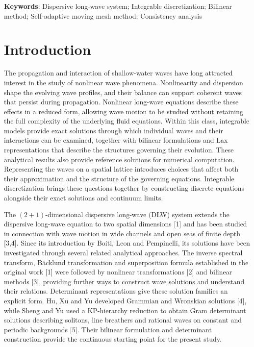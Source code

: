 \documentclass{article}
\theoremstyle{plain}
\theoremstyle{definition}
\begin{document}
{\bfseries Keywords}: Dispersive long-wave system; Integrable discretization; Bilinear method; Self-adaptive moving mesh method; Consistency analysis

\FloatBarrier
\section{Introduction}

The propagation and interaction of shallow-water waves have long attracted interest in the study of nonlinear wave phenomena. Nonlinearity and dispersion shape the evolving wave profiles, and their balance can support coherent waves that persist during propagation. Nonlinear long-wave equations describe these effects in a reduced form, allowing wave motion to be studied without retaining the full complexity of the underlying fluid equations. Within this class, integrable models provide exact solutions through which individual waves and their interactions can be examined, together with bilinear formulations and Lax representations that describe the structures governing their evolution. These analytical results also provide reference solutions for numerical computation. Representing the waves on a spatial lattice introduces choices that affect both their approximation and the structure of the governing equations. Integrable discretization brings these questions together by constructing discrete equations alongside their exact solutions and continuum limits.

The \((2+1)\)-dimensional dispersive long-wave (DLW) system extends the dispersive long-wave equation to two spatial dimensions [1] and has been studied in connection with wave motion in wide channels and open seas of finite depth [3,4]. Since its introduction by Boiti, Leon and Pempinelli, its solutions have been investigated through several related analytical approaches. The inverse spectral transform, Bäcklund transformation and superposition formula established in the original work [1] were followed by nonlinear transformations [2] and bilinear methods [3], providing further ways to construct wave solutions and understand their relations. Determinant representations give these solution families an explicit form. Hu, Xu and Yu developed Grammian and Wronskian solutions [4], while Sheng and Yu used a KP-hierarchy reduction to obtain Gram determinant solutions describing solitons, line breathers and rational waves on constant and periodic backgrounds [5]. Their bilinear formulation and determinant construction provide the continuous starting point for the present study.
\end{document}
